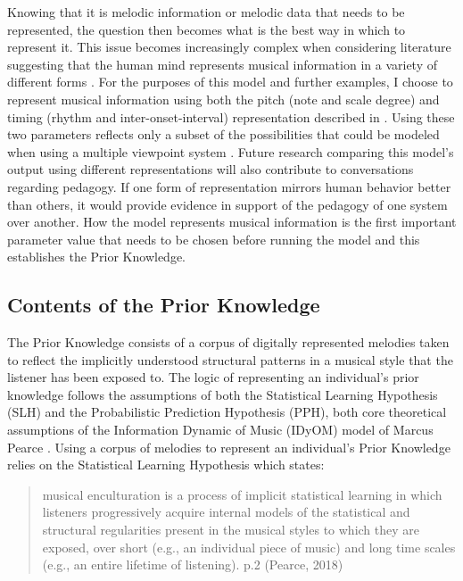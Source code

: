 \documentclass[12pt,]{book}
\begin{document}
Knowing that it is melodic information or melodic data that needs to be represented, the question then becomes what is the best way in which to represent it.
This issue becomes increasingly complex when considering literature suggesting that the human mind represents musical information in a variety of different forms \citep{krumhanslCognitiveFoundationsMusical2001, levitinCurrentAdvancesCognitive2009}.
For the purposes of this model and further examples, I choose to represent musical information using both the pitch (note and scale degree) and timing (rhythm and inter-onset-interval) representation described in \citet{pearceStatisticalLearningProbabilistic2018a}.
Using these two parameters reflects only a subset of the possibilities that could be modeled when using a multiple viewpoint system \citep{conklinMultipleViewpointSystems1995}.
Future research comparing this model's output using different representations will also contribute to conversations regarding pedagogy.
If one form of representation mirrors human behavior better than others, it would provide evidence in support of the pedagogy of one system over another.
How the model represents musical information is the first important parameter value that needs to be chosen before running the model and this establishes the Prior Knowledge.

\hypertarget{contents-of-the-prior-knowledge}{%
\subsection{Contents of the Prior Knowledge}\label{contents-of-the-prior-knowledge}}

The Prior Knowledge consists of a corpus of digitally represented melodies taken to reflect the implicitly understood structural patterns in a musical style that the listener has been exposed to.
The logic of representing an individual's prior knowledge follows the assumptions of both the Statistical Learning Hypothesis (SLH) and the Probabilistic Prediction Hypothesis (PPH), both core theoretical assumptions of the Information Dynamic of Music (IDyOM) model of Marcus Pearce \citep{pearceConstructionEvaluationStatistical2005, pearceStatisticalLearningProbabilistic2018a}.
Using a corpus of melodies to represent an individual's Prior Knowledge relies on the Statistical Learning Hypothesis which states:

\begin{quote}
musical enculturation is a process of implicit statistical learning in which listeners progressively acquire internal models of the statistical and structural regularities present in the musical styles to which they are exposed, over short (e.g., an individual piece of music) and long time scales (e.g., an entire lifetime of listening). p.2 (Pearce, 2018)
\end{quote}
\end{document}
